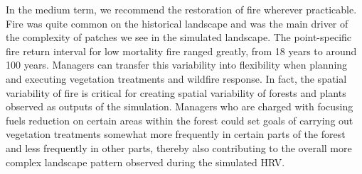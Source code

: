 In the medium term, we recommend the restoration of fire wherever practicable. Fire was quite common on the historical landscape and was the main driver of the complexity of patches we see in the simulated landscape. The point-specific fire return interval for low mortality fire ranged greatly, from 18 years to around 100 years. Managers can transfer this variability into flexibility when planning and executing vegetation treatments and wildfire response. In fact, the spatial variability of fire is critical for creating spatial variability of forests and plants observed as outputs of the simulation. Managers who are charged with focusing fuels reduction on certain areas within the forest could set goals of carrying out vegetation treatments somewhat more frequently in certain parts of the forest and less frequently in other parts, thereby also contributing to the overall more complex landscape pattern observed during the simulated HRV. 

